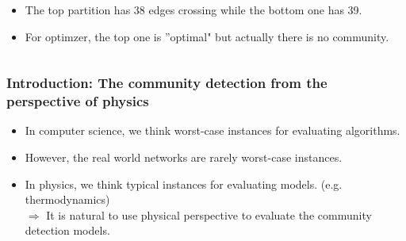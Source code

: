 \documentclass[dvipdfmx,11pt]{beamer}
\begin{document}
\begin{frame}
\begin{columns}
      \begin{column}{0.60\textwidth}
        \begin{itemize}
          \item The top partition has 38 edges crossing while the bottom one has 39.
          \item For optimzer, the top one is ''optimal" but actually there is no community. 
        \end{itemize}
      \end{column}
    \end{columns}
\end{frame}



\begin{frame}
  \frametitle{Introduction: The community detection from the perspective of physics}

  \begin{itemize}
      \item In computer science, we think \alert{worst-case instances} for evaluating algorithms.
      \item However, the real world networks are rarely worst-case instances.
      \item In physics, we think \alert{typical instances} for evaluating models. (e.g. thermodynamics) \\
      $\Rightarrow$ It is natural to use physical perspective to evaluate the community detection models.
  \end{itemize}
\end{frame}
\end{document}
